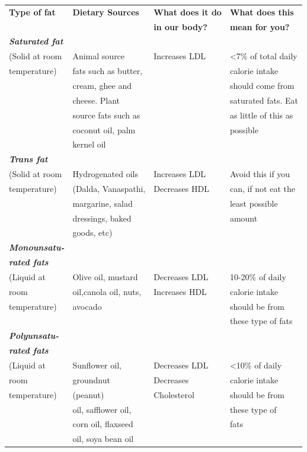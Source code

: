 {
\addtolength{\tabcolsep}{-6pt}
\begin{longtable}{|l|l|l|l|}
\hline
\textbf{Type of fat} & \textbf{Dietary Sources} & \textbf{What does it do} & \textbf{What does this}\\
 &  & \textbf{in our body?} & \textbf{mean for you?}\\
\hline
\textbf{\textit{Saturated fat}} &  &  & \\
(Solid at room & Animal source & Increases LDL & \textless 7\% of total daily\\
temperature) & fats such as butter, &  & calorie intake\\
 & cream, ghee and &  & should come from\\
 & cheese. Plant &  & saturated fats. Eat\\
 & source fats such as &  & as little of this as\\
 & coconut oil, palm &  & possible\\
 & kernel oil &  & \\
\hline
\textbf{\textit{Trans fat}} &  &  & \\
(Solid at room & Hydrogenated oils & Increases LDL & Avoid this if you\\
temperature) & (Dalda, Vanaspathi, & Decreases HDL & can, if not eat the\\
 & margarine, salad &  & least possible\\
 & dressings, baked &  & amount\\
 & goods, etc) &  & \\
\hline
\textbf{\textit{Monounsatu-}} &  &  & \\
\textbf{\textit{rated fats}} &  &  & \\
(Liquid at & Olive oil, mustard & Decreases LDL & 10-20\% of daily\\
room & oil,canola oil, nuts, & Increases HDL & calorie intake\\
temperature) & avocado &  & should be from\\
 &  &  & these type of fats\\
\hline
\textbf{\textit{Polyunsatu-}} &  &  & \\
\textbf{\textit{rated fats}} &  &  & \\
(Liquid at & Sunflower oil, & Decreases LDL & \textless 10\% of daily\\
room & groundnut & Decreases & calorie intake\\
temperature) & (peanut) & Cholesterol & should be from\\
 & oil, safflower oil, &  & these type of\\
 & corn oil, flaxseed &  & fats\\
 & oil, soya bean oil &  & \\
\hline
\end{longtable}
}\relax

